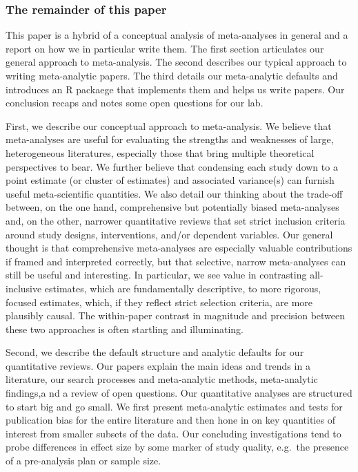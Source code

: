 \documentclass[
  man]{apa6}
\begin{document}
\subsubsection{The remainder of this paper}\label{the-remainder-of-this-paper}

This paper is a hybrid of a conceptual analysis of meta-analyses in general and a report on how we in particular write them. The first section articulates our general approach to meta-analysis. The second describes our typical approach to writing meta-analytic papers. The third details our meta-analytic defaults and introduces an R packaege that implements them and helps us write papers. Our conclusion recaps and notes some open questions for our lab.

First, we describe our conceptual approach to meta-analysis. We believe that meta-analyses are useful for evaluating the strengths and weaknesses of large, heterogeneous literatures, especially those that bring multiple theoretical perspectives to bear. We further believe that condensing each study down to a point estimate (or cluster of estimates) and associated variance(s) can furnish useful meta-scientific quantities. We also detail our thinking about the trade-off between, on the one hand, comprehensive but potentially biased meta-analyses and, on the other, narrower quantitative reviews that set strict inclusion criteria around study designs, interventions, and/or dependent variables. Our general thought is that comprehensive meta-analyses are especially valuable contributions if framed and interpreted correctly, but that selective, narrow meta-analyses can still be useful and interesting. In particular, we see value in contrasting all-inclusive estimates, which are fundamentally descriptive, to more rigorous, focused estimates, which, if they reflect strict selection criteria, are more plausibly causal. The within-paper contrast in magnitude and precision between these two approaches is often startling and illuminating.

Second, we describe the default structure and analytic defaults for our quantitative reviews. Our papers explain the main ideas and trends in a literature, our search processes and meta-analytic methods, meta-analytic findings,a nd a review of open questions. Our quantitative analyses are structured to start big and go small. We first present meta-analytic estimates and tests for publication bias for the entire literature and then hone in on key quantities of interest from smaller subsets of the data. Our concluding investigations tend to probe differences in effect size by some marker of study quality, e.g.~the presence of a pre-analysis plan or sample size.
\end{document}
